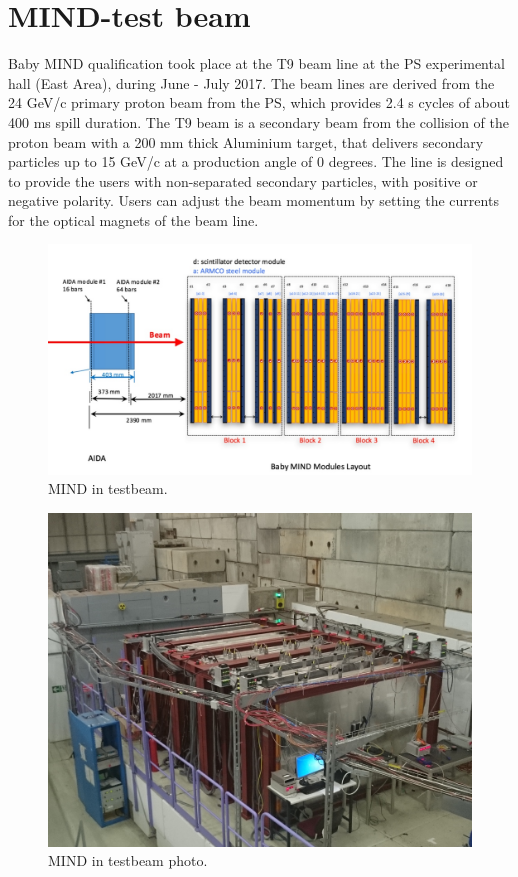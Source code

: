 \pagebreak
\section{MIND-test beam}

Baby MIND qualification took place at the T9 beam line at the PS experimental hall (East Area), during June - July 2017. The beam lines are derived from the 24 GeV/c primary proton beam from the PS, which provides 2.4 s cycles of about 400 ms spill duration. The T9 beam is a secondary beam from the collision of the proton beam with a 200 mm thick Aluminium target, that delivers secondary particles up to 15 GeV/c at a production angle of 0 degrees. The line is designed to provide the users with non-separated secondary particles, with positive or negative polarity. Users can adjust the beam momentum by setting the currents for the optical magnets of the beam line.

\begin{figure}[h!]
\centering
\includegraphics[width=\textwidth]{figures/MINDAIDAtestbeam.jpeg}
\caption{MIND in testbeam.}
\label{fig:MINDtb}
\end{figure}

\begin{figure}[h!]
\centering
\includegraphics[width=\textwidth]{figures/DSC_2619.JPG}
\caption{MIND in testbeam photo.}
\label{fig:MINDtbreal}
\end{figure}


